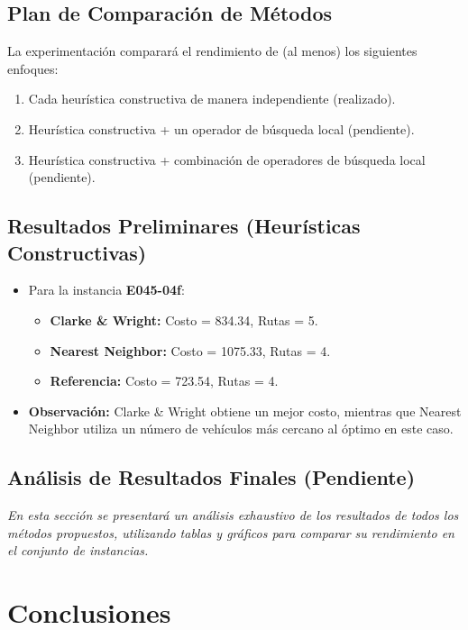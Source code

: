 \documentclass[a4paper,12pt]{article}
\begin{document}
\subsection{Plan de Comparación de Métodos}
La experimentación comparará el rendimiento de (al menos) los siguientes enfoques:
\begin{enumerate}
    \item Cada heurística constructiva de manera independiente (realizado).
    \item Heurística constructiva + un operador de búsqueda local (pendiente).
    \item Heurística constructiva + combinación de operadores de búsqueda local (pendiente).
\end{enumerate}

\subsection{Resultados Preliminares (Heurísticas Constructivas)}
\begin{itemize}
    \item Para la instancia \textbf{E045-04f}:
    \begin{itemize}
        \item \textbf{Clarke \& Wright:} Costo = 834.34, Rutas = 5.
        \item \textbf{Nearest Neighbor:} Costo = 1075.33, Rutas = 4.
        \item \textbf{Referencia:} Costo = 723.54, Rutas = 4.
    \end{itemize}
    \item \textbf{Observación:} Clarke \& Wright obtiene un mejor costo, mientras que Nearest Neighbor utiliza un número de vehículos más cercano al óptimo en este caso.
\end{itemize}

\subsection{Análisis de Resultados Finales (Pendiente)}
\textit{En esta sección se presentará un análisis exhaustivo de los resultados de todos los métodos propuestos, utilizando tablas y gráficos para comparar su rendimiento en el conjunto de instancias.}

\section{Conclusiones}
\end{document}
